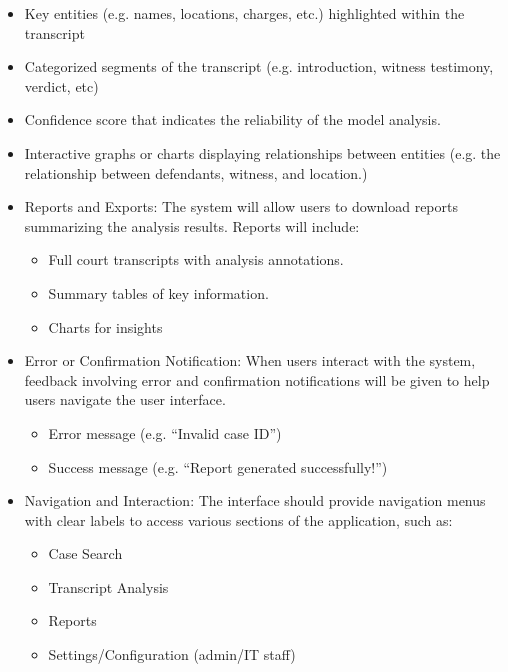 \documentclass[12pt]{article}
\begin{document}
\begin{itemize}
\begin{itemize}
\begin{itemize}
			\begin{itemize}
				\item  Key entities (e.g. names, locations, charges, etc.) highlighted within the transcript
				\item Categorized segments of the transcript (e.g. introduction, witness testimony, verdict, etc)
				\item  Confidence score that indicates the reliability of the model analysis.
				\item  Interactive graphs or charts displaying relationships between entities (e.g. the relationship between defendants, witness, and location.)
			\end{itemize}
		\end{itemize}
		\begin{itemize}
			\item  Reports and Exports: The system will allow users to download reports summarizing the analysis results. Reports will include:
			\begin{itemize}
				\item  Full court transcripts with analysis annotations.
				\item Summary tables of key information.
				\item Charts for insights
			\end{itemize}
		\end{itemize}
		\begin{itemize}
			\item   Error or Confirmation Notification: When users interact with the system, feedback involving error and confirmation notifications will be given to help users navigate the user interface.
			\begin{itemize}
				\item  Error message (e.g. “Invalid case ID”)
				\item Success message (e.g. “Report generated successfully!”)
			\end{itemize}
		\end{itemize}
		\begin{itemize}
			\item  Navigation and Interaction: The interface should provide navigation menus with clear labels to access various sections of the application, such as:
			\begin{itemize}
				\item  Case Search
				\item Transcript Analysis
				\item Reports
				\item  Settings/Configuration (admin/IT staff)

\end{itemize}
\end{itemize}
\end{itemize}
\end{itemize}
\end{document}
